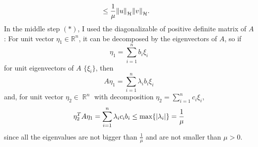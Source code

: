 \documentclass{article}
\DeclareMathOperator{\rr}{\mathbb{R}}
\begin{document}
\begin{enumerate}
\begin{enumerate}
\begin{equation*}
\begin{split}
&\leq \frac{1}{\mu}\norm{u}_{\mathcal{H}}\norm{v}_{\mathcal{H}}.
\end{split}
\end{equation*}
In the middle step $(*)$, I used the diagonalizable of positive definite matrix of $A$: For unit vector $\eta_1\in \mathbb{R}^n$, it can be decomposed by the eigenvectors of $A$, so if
\begin{equation*}
\eta_1=\sum\limits_{i=1}^n b_i \xi_i
\end{equation*}
for unit eigenvectors of $A$ $\{\xi_i\}$, then
\begin{equation*}
A\eta_1 = \sum\limits_{i=1}^n\lambda_i b_i \xi_i
\end{equation*}
and, for unit vector $\eta_2\in \rr^n$ with decomposition $\eta_2= \sum\limits_{i=1}^n c_i \xi_i$,
\begin{equation*}
\eta_2^T A \eta_1=\sum\limits_{i=1}^n\lambda_i c_i b_i\leq \max\{\abs{\lambda_i}\}=\frac{1}{\mu}
\end{equation*}
since all the eigenvalues are not bigger than $\frac{1}{\mu}$ and are not smaller than $\mu>0$.


\end{enumerate}
\end{enumerate}
\end{document}
